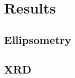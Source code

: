 \chapter{Results}
\label{ch:results}
\thispagestyle{empty}


\section{Ellipsometry}

\lipsum


\section{XRD}

\lipsum








